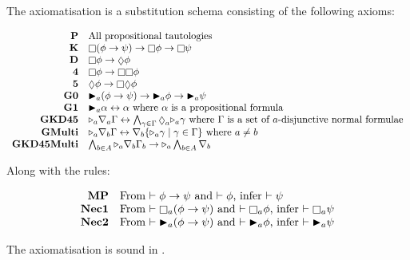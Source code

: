 \begin{definition}[\axiomKDF]
The axiomatisation \axiomKDF{} is a substitution schema consisting of the
following axioms:

$$
\begin{array}{rl}
{\bf P} & \text{All propositional tautologies}\\
{\bf K} & \knows (\phi \implies \psi) \implies \knows \phi \implies \knows
\psi\\
{\bf D} & \knows \phi \implies \suspects \phi\\
{\bf 4} & \knows \phi \implies \knows \knows \phi\\
{\bf 5} & \suspects \phi \implies \knows \suspects \phi\\
{\bf G0} & \allrefs_a (\phi \implies \psi) \implies \allrefs_a \phi \implies
\allrefs_a \psi\\
{\bf G1} & \allrefs_a \alpha \iff \alpha \text{ where $\alpha$ is a
propositional formula}\\
{\bf GKD45} & \somerefs_a \covers_a \Gamma \iff \bigwedge_{\gamma \in \Gamma}
\suspects_a \somerefs_a \gamma \text{ where $\Gamma$ is a set of $a$-disjunctive
normal formulae}\\
{\bf GMulti} & \somerefs_a \covers_b \Gamma \iff \covers_b \{\somerefs_a \gamma
\mid \gamma \in \Gamma\} \text{ where $a \neq b$}\\
{\bf GKD45Multi} & \bigwedge_{b \in A} \somerefs_a \covers_b \Gamma_b \implies
\somerefs_a \bigwedge_{b \in A} \covers_b 
\end{array}
$$

Along with the rules:

$$
\begin{array}{rl}
{\bf MP} & \text{From $\proves \phi \implies \psi$ and $\proves \phi$, infer
$\proves \psi$}\\
{\bf Nec1} & \text{From $\proves \knows_a (\phi \implies \psi)$ and $\proves
\knows_a \phi$, infer $\proves \knows_a \psi$}\\
{\bf Nec2} & \text{From $\proves \allrefs_a (\phi \implies \psi)$ and $\proves
\allrefs_a \phi$, infer $\proves \allrefs_a \psi$}
\end{array}
$$
\end{definition}

\begin{lemma}
The axiomatisation \axiomKDF{} is sound in \logicKDF{}.
\end{lemma}

